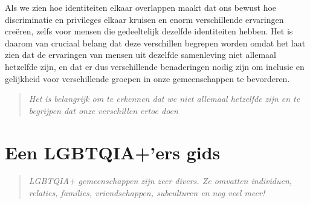 \documentclass[12pt,openany]{book}
\begin{document}
Als we zien hoe identiteiten elkaar overlappen maakt dat ons bewust hoe discriminatie en privileges elkaar kruisen en enorm verschillende ervaringen creëren, zelfs voor mensen die gedeeltelijk dezelfde identiteiten hebben. Het is daarom van cruciaal belang dat deze verschillen begrepen worden omdat het laat zien dat de ervaringen van mensen uit dezelfde samenleving niet allemaal hetzelfde zijn, en dat er dus verschillende benaderingen nodig zijn om inclusie en gelijkheid voor verschillende groepen in onze gemeenschappen te bevorderen.

\begin{quote}
\textit{Het is belangrijk om te erkennen dat we niet allemaal hetzelfde zijn en te begrijpen dat onze verschillen ertoe doen}
\end{quote}

\begin{figure}[h]
    \centering
\end{figure}

\chapter*{Een LGBTQIA+’ers gids}

\begin{quote}
\textit{LGBTQIA+ gemeenschappen zijn zeer divers. Ze omvatten individuen, relaties, families, vriendschappen, subculturen en nog veel meer!}
\end{quote}
\end{document}

